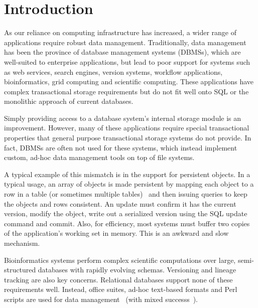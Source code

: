 \documentclass[letterpaper,twocolumn,10pt]{article}
\begin{document}




\section{Introduction}

As our reliance on computing infrastructure has increased, a wider range of 
applications require robust data management.  Traditionally, data management
has been the province of database management systems (DBMSs), which are
well-suited to enterprise applications, but lead to poor support for
systems such as web services, search engines, version systems, workflow 
applications, bioinformatics, grid computing and scientific computing.  These 
applications have complex transactional storage requirements
but do not fit well
onto SQL or the monolithic approach of current databases.  

Simply providing
access to a database system's internal storage module is an improvement.
However, many of these applications require special transactional properties 
that general purpose transactional storage systems do not provide.  In
fact, DBMSs are often not used for these systems, which instead
implement custom, ad-hoc data management tools on top of file
systems.

A typical example of this mismatch is in the support for
persistent objects.
In a typical usage, an array of objects is made persistent by
mapping each object to a row in a table (or sometimes multiple
tables)~\cite{hibernate} and then issuing queries to keep the objects and
rows consistent. An update must confirm it has the current
version, modify the object, write out a serialized version using the
SQL update command and commit.  Also, for efficiency, most systems must 
buffer two copies of the application's working set in memory.  
This is an awkward and slow mechanism.

Bioinformatics systems perform complex scientific
computations over large, semi-structured databases with rapidly evolving schemas.  Versioning and
lineage tracking are also key concerns.  Relational databases support
none of these requirements well.  Instead, office suites, ad-hoc
text-based formats and Perl scripts are used for data management~\cite{perl} (with mixed successs~\cite{excel}).
\end{document}
